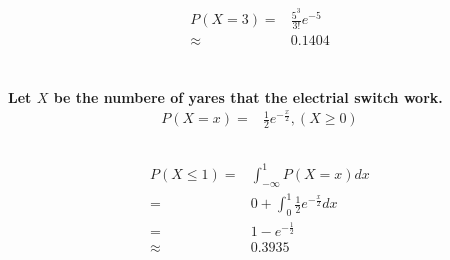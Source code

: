 \documentclass{article}
\begin{document}
        \subsection{}
            \paragraph{
                \begin{equation*}
                    \begin{split}
                        P(X=3)=&\frac{5^{3}}{3!}e^{-5}\\
                            \approx&0.1404
                    \end{split}
                \end{equation*}
            }
    \section{}
        \paragraph{
            Let $X$ be the numbere of yares that the electrial switch work. 
            \begin{equation*}
                \begin{split}
                    P(X=x)=&\frac{1}{2}e^{-\frac{x}{2}}, (X\geq 0)
                \end{split}
            \end{equation*}
        }
        \subsection{}
            \paragraph{
                \begin{equation*}
                    \begin{split}
                        P(X\leq 1)=&\int_{-\infty}^1 P(X=x)dx\\
                            =&0+\int_0^1 \frac{1}{2}e^{-\frac{x}{2}}dx\\
                            =&1-e^{-\frac{1}{2}}\\
                            \approx&0.3935
                    \end{split}
                \end{equation*}
            }
\end{document}

